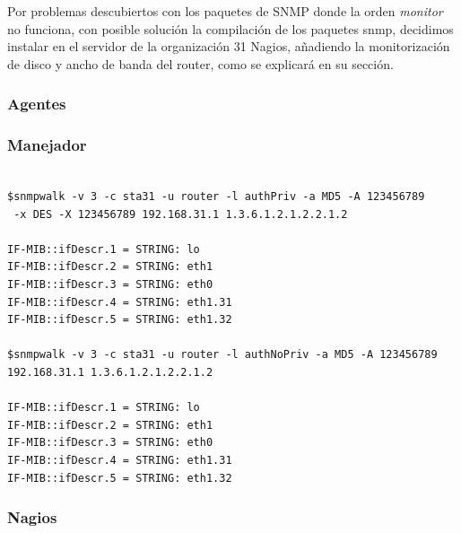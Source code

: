 \documentclass[]{article}
\begin{document}
Por problemas descubiertos con los paquetes de SNMP donde la orden \textit{monitor} no funciona, con posible solución la compilación de los paquetes snmp, decidimos instalar en el servidor de la organización 31 Nagios, añadiendo la monitorización de disco y ancho de banda del router, como se explicará en su sección.

\subsubsection{Agentes}
\subsubsection{Manejador}

\begin{Verbatim}[frame=single]

$snmpwalk -v 3 -c sta31 -u router -l authPriv -a MD5 -A 123456789
 -x DES -X 123456789 192.168.31.1 1.3.6.1.2.1.2.2.1.2

IF-MIB::ifDescr.1 = STRING: lo
IF-MIB::ifDescr.2 = STRING: eth1
IF-MIB::ifDescr.3 = STRING: eth0
IF-MIB::ifDescr.4 = STRING: eth1.31
IF-MIB::ifDescr.5 = STRING: eth1.32

$snmpwalk -v 3 -c sta31 -u router -l authNoPriv -a MD5 -A 123456789 
192.168.31.1 1.3.6.1.2.1.2.2.1.2

IF-MIB::ifDescr.1 = STRING: lo
IF-MIB::ifDescr.2 = STRING: eth1
IF-MIB::ifDescr.3 = STRING: eth0
IF-MIB::ifDescr.4 = STRING: eth1.31
IF-MIB::ifDescr.5 = STRING: eth1.32
\end{Verbatim}


\subsubsection{Nagios}
\end{document}
